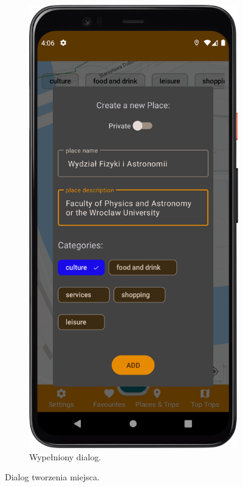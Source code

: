 \begin{figure}[H]
\begin{subfigure}[b]{0.3\textwidth}
            \end{subfigure}
            \hfill
            \begin{subfigure}[b]{0.3\textwidth}
                \centering
                \includegraphics[width=\textwidth]{src/app/add_place2.png}
                \caption{Wypełniony dialog.\label{place_filled}}
            \end{subfigure}
            \caption{Dialog tworzenia miejsca.\label{add_place}}
            \qquad
        \end{figure} 

